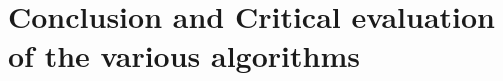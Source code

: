\section{Conclusion and Critical evaluation of the various algorithms}
\label{chap:Conclusion and Critical evaluation of the various algorithms}
